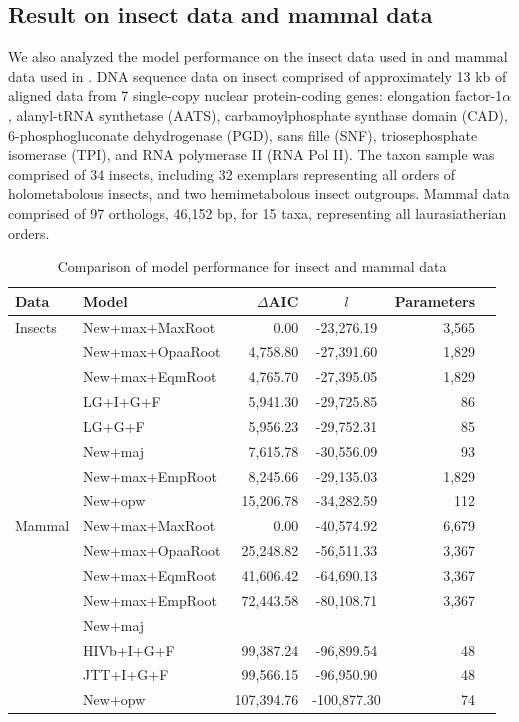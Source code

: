 \subsection{Result on insect data and mammal data}
We also analyzed the model performance on the insect data used in \cite{McKenna2010} and mammal data used in \cite{zhou12mammal}. 
DNA sequence data on insect comprised of approximately 13 kb of aligned data from 7 single-copy nuclear protein-coding genes: elongation factor-1$\alpha$, alanyl-tRNA synthetase (AATS), carbamoylphosphate synthase domain (CAD), 6-phosphogluconate dehydrogenase (PGD), sans fille (SNF), triosephosphate isomerase (TPI), and RNA polymerase II (RNA Pol II). 
The taxon sample was comprised of 34 insects, including 32 exemplars representing all orders of holometabolous insects, and two hemimetabolous insect outgroups.
Mammal data comprised of 97 orthologs, 46,152 bp, for 15 taxa, representing all laurasiatherian orders. 
\begin{table}[!h]
\begin{center}
\begin{tabular}{ l | l r c r r}
\hline
Data & Model & $\Delta$AIC & $l$ &  Parameters \\
\hline
Insects & New+max+MaxRoot & 0.00 & -23,276.19 & 3,565\\
&New+max+OpaaRoot & 4,758.80 & -27,391.60 & 1,829\\
&New+max+EqmRoot & 4,765.70 & -27,395.05 & 1,829\\
&LG+I+G+F &  5,941.30 & -29,725.85 & 86 \\
&LG+G+F & 5,956.23 & -29,752.31 & 85 \\
&New+maj & 7,615.78 & -30,556.09 &  93\\
&New+max+EmpRoot & 8,245.66 & -29,135.03 &  1,829\\
&New+opw & 15,206.78  & -34,282.59 & 112 \\

\hline
Mammal & New+max+MaxRoot & 0.00 & -40,574.92 & 6,679\\
&New+max+OpaaRoot & 25,248.82 & -56,511.33 & 3,367\\
&New+max+EqmRoot & 41,606.42 & -64,690.13 & 3,367\\
&New+max+EmpRoot & 72,443.58 & -80,108.71 & 3,367\\
&New+maj &  &  &   \\
&HIVb+I+G+F & 99,387.24 & -96,899.54 & 48 \\
&JTT+I+G+F & 99,566.15 & -96,950.90 &48 \\
&New+opw & 107,394.76 & -100,877.30 & 74  \\
\hline
\end{tabular}
\end{center}
\caption{Comparison of model performance for insect and mammal data}
\label{table:beetle_mammal}
\end{table}
